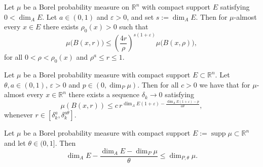 \documentclass[10pt,a4paper]{amsart}
\begin{document}
\begin{lemma}\label{lem:assouad_measure_growth}
Let $\mu$ be a Borel probability measure on $\mathbb{R}^n$ with compact
support $E$ satisfying $0<\dim_A E$. Let $a\in(0,1)$ and $\varepsilon>0$,
and set $s:=\dim_A E$. Then for $\mu$-almost every $x\in E$ there exists
$\rho_0(x)>0$ such that
\begin{equation}\label{eq:ball_growth}
\mu\bigl(B(x,r)\bigr)
\le \left(\frac{4r}{\rho}\right)^{s(1+\varepsilon)}\mu\bigl(B(x,\rho)\bigr),
\end{equation}
for all $0<\rho<\rho_0(x)$ and $\rho^{a}\le r\le 1.$\end{lemma}

\begin{lemma}\label{Lemma 3.9}
Let $\mu$ be a Borel probability measure with compact support $E \subset \mathbb{R}^n$. 
Let $\theta, a \in (0,1)$, $\varepsilon>0$ and $ p \in (0,\dim_P \mu)$. Then for all $c>0$ we have that for $\mu$-almost every $x \in \mathbb{R}^n$ there exists a sequence $\delta_k \to 0$ satisfying
\[
\mu(B(x,r)) \leq c\, r^{\dim_A E(1+\varepsilon)-\frac{\dim_A E(1+\varepsilon)-p}{a\theta}},
\]
whenever $r \in [\delta_k^a,\delta_k^{a\theta}]$.
\end{lemma}

\begin{lemma}\label{lem:threshold_lower_bound}
    Let $\mu$ be a Borel probability measure with compact support
    $E:=\operatorname{supp}\mu\subset\mathbb{R}^n$ and let
    $\theta\in(0,1]$. Then
    $$\dim_A E - \frac{\dim_A E - \dim_P \mu}{\theta}\leq \dim_{P,\theta}\mu.$$
\end{lemma}
\end{document}
